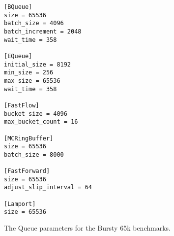 \begin{listing}
\begin{verbatim}
[BQueue]
size = 65536
batch_size = 4096
batch_increment = 2048
wait_time = 358

[EQueue]
initial_size = 8192
min_size = 256
max_size = 65536
wait_time = 358

[FastFlow]
bucket_size = 4096
max_bucket_count = 16

[MCRingBuffer]
size = 65536
batch_size = 8000

[FastForward]
size = 65536
adjust_slip_interval = 64

[Lamport]
size = 65536
\end{verbatim}
\caption{The Queue parameters for the Bursty 65k benchmarks.}
\label{fig:toml-bursty-65k}
\end{listing}
